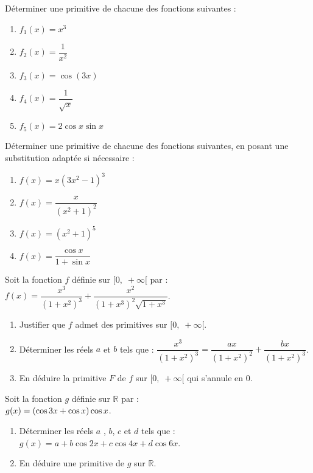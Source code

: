 



 \summary{}
 
\begin{exercice}
Déterminer une primitive de chacune des fonctions suivantes :
\begin{enumerate}
  \item $f_1(x) = x^3$
  \item $f_2(x) = \dfrac{1}{x^2}$
  \item $f_3(x) = \cos(3x)$
  \item $f_4(x) = \dfrac{1}{\sqrt{x}}$
  \item $f_5(x) = 2\cos x \sin x$
\end{enumerate}
\end{exercice}

\begin{exercice}
Déterminer une primitive de chacune des fonctions suivantes, en posant une substitution adaptée si nécessaire :
\begin{enumerate}
  \item $f(x) = x(3x^2 - 1)^3$
  \item $f(x) = \dfrac{x}{(x^2 + 1)^2}$
  \item $f(x) = (x^2 + 1)^5$
  \item $f(x) = \dfrac{\cos x}{1 + \sin x}$
\end{enumerate}
\end{exercice}
\begin{exercice}
 Soit la fonction $ f $  définie sur $  [0,\; +\infty[ $  par : \; $ f(x)=\dfrac{x^3}{(1+x^2)^3}+ \dfrac{x^2}{(1+x^3)^2\sqrt{1+x^3}} $.
\begin{enumerate}
\item Justifier que $ f $ admet des primitives sur $  [0,\; +\infty[ $.
\item Déterminer les réels $a $ et $ b$ tels que :\; $ \dfrac{x^3}{(1+x^2)^3}=\dfrac{ax}{(1+x^2)^2}+\dfrac{bx}{(1+x^2)^3} $.
\item En déduire la primitive $ F $ de $ f $  sur $  [0,\; +\infty[ $ qui s'annule en 0.
\end{enumerate}
\end{exercice}
\begin{exercice}
Soit la fonction $ g $  définie sur $ \mathbb{R} $  par : \\ $ g(x)=\left(\cos 3x  +\cos x\right)\cos x $.
\begin{enumerate}
\item Déterminer les réels $a $ , $ b $, $ c $ et $ d$ tels que :\; $ g(x)=a+b\cos 2x +c\cos 4x +d\cos 6x$.
\item En déduire une primitive de $ g $  sur $\mathbb{R} $.  
\end{enumerate}
\end{exercice}

